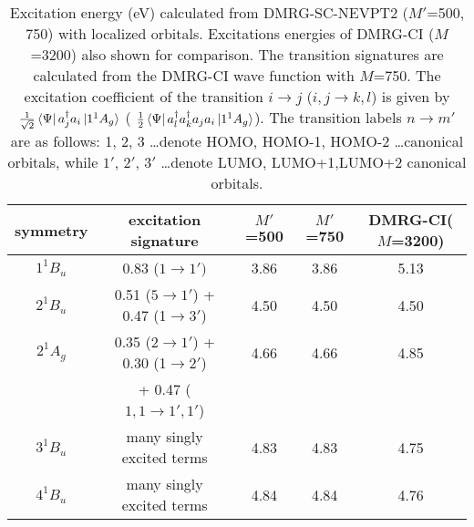 \begin{table*}
  \centering
  \caption{Excitation energy (eV) calculated from DMRG-SC-NEVPT2 ($M'$=500, 750) with localized orbitals.
    Excitations energies of DMRG-CI ($M$=3200) also shown for comparison. The transition signatures are calculated from the
    DMRG-CI wave function with $M$=750. The excitation coefficient of the transition $i\rightarrow j$ ($i,j \rightarrow k,l$) is given by $\frac{1}{\sqrt{2}}\bra{\Psi}a^\dagger_j a_i\ket{1^1A_g}$ ( $\frac{1}{2}\bra{\Psi}a^\dagger_l a^\dagger_k a_j a_i\ket{1^1A_g}$).
The transition labels $n\rightarrow m'$ are as follows: 1, 2, 3 \ldots denote HOMO, HOMO-1, HOMO-2 \ldots canonical orbitals, while $1'$, $2'$, $3'$ \ldots denote LUMO, LUMO+1,LUMO+2 canonical orbitals. }
  \label{table:local}
  \begin{tabular}{ccccc}
    \hline
\hline
symmetry & excitation signature &  $M'$=500 & $M'$=750 & DMRG-CI($M$=3200) \\

\hline
  $1^1B_u$ & 0.83 ($1\rightarrow1')$ & 3.86   &   3.86   & 5.13 \\
  $2^1B_u$ & 0.51 ($5\rightarrow 1'$) + 0.47 (1$\rightarrow 3'$) & 4.50   &   4.50   & 4.50    \\
  $2^1A_g$ & 0.35 ($2\rightarrow 1'$) + 0.30 (1$\rightarrow 2'$) & 4.66   &   4.66   & 4.85    \\
  &   + 0.47 ($1,1\rightarrow1',1'$)  & & &\\
  $3^1B_u$ & many singly excited terms & 4.83   &   4.83   & 4.75    \\
  $4^1B_u$ & many singly excited terms & 4.84   &   4.84   & 4.76    \\
\hline
\hline
\end{tabular}
\end{table*}
